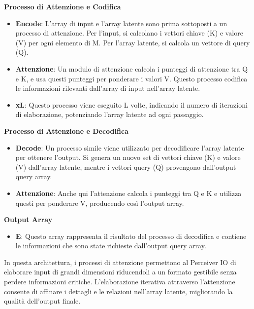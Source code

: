 \documentclass[
  11pt,
]{article}
\begin{document}
\textbf{Processo di Attenzione e Codifica}

\begin{itemize}
\item
  \textbf{Encode}: L'array di input e
  l'array latente sono prima sottoposti a un processo di
  attenzione. Per l'input, si calcolano i vettori chiave
  (K) e valore (V) per ogni elemento di M. Per l'array
  latente, si calcola un vettore di query (Q).
\item
  \textbf{Attenzione}: Un modulo di attenzione calcola i punteggi di
  attenzione tra Q e K, e usa questi punteggi per ponderare i valori V.
  Questo processo codifica le informazioni rilevanti
  dall'array di input nell'array
  latente.
\item
  \textbf{xL}: Questo processo viene eseguito L volte, indicando il
  numero di iterazioni di elaborazione, potenziando
  l'array latente ad ogni passaggio.
\end{itemize}

\textbf{Processo di Attenzione e Decodifica}

\begin{itemize}
\item
  \textbf{Decode}: Un processo simile viene utilizzato per decodificare
  l'array latente per ottenere l'output.
  Si genera un nuovo set di vettori chiave (K) e valore (V)
  dall'array latente, mentre i vettori query (Q)
  provengono dall'output query array.
\item
  \textbf{Attenzione}: Anche qui l'attenzione calcola i
  punteggi tra Q e K e utilizza questi per ponderare V, producendo così
  l'output array.
\end{itemize}

\textbf{Output Array}

\begin{itemize}
\item
  \textbf{E}: Questo array rappresenta il risultato del processo di
  decodifica e contiene le informazioni che sono state richieste
  dall'output query array.
\end{itemize}

In questa architettura, i processi di attenzione permettono al Perceiver
IO di elaborare input di grandi dimensioni riducendoli a un formato
gestibile senza perdere informazioni critiche.
L'elaborazione iterativa attraverso
l'attenzione consente di affinare i dettagli e le
relazioni nell'array latente, migliorando la qualità
dell'output finale.
\end{document}
